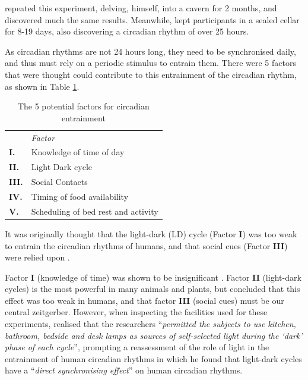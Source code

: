 \citet{siffreTime1964} repeated this experiment, delving, himself, into a cavern for 2 months, and discovered much the same results. Meanwhile, \citet{vonaschoffSpontanperiodikMenschenBei1962} kept participants in a sealed cellar for 8-19 days, also discovering a circadian rhythm of over 25 hours.

As circadian rhythms are not 24 hours long, they need to be synchronised daily, and thus must rely on a periodic stimulus to entrain them. There were 5 factors that were thought could contribute to this entrainment of the circadian rhythm, as shown in Table \ref{Tab:Factors}.

\begin{table}
\caption{The 5 potential factors for circadian entrainment \citep{czeislerEntrainmentHumanOrcadian1981}}
\label{Tab:Factors}
\begin{tabular}{l l}
\hline
 & \textit{Factor} \\
\textbf{I.}& Knowledge of time of day \\
\textbf{II.}& Light Dark cycle \\
\textbf{III.}& Social Contacts \\
\textbf{IV.}& Timing of food availability \\
\textbf{V.}& Scheduling of bed rest and activity \\
\hline
\end{tabular}
\end{table}


It was originally thought that the light-dark (LD) cycle (Factor \textbf{I}) was too weak to entrain the circadian rhythms of humans, and that social cues (Factor \textbf{III}) were relied upon \citep{aschoffHumanCircadianRhythms1971}. 

Factor \textbf{I} (knowledge of time) was shown to be insignificant \citep{millsCircadianRhythmsThree1964}. Factor \textbf{II} (light-dark cycles) is the most powerful in many animals and plants, but \citet{aschoffHumanCircadianRhythms1971} concluded that this effect was too weak in humans, and that factor \textbf{III} (social cues) must be our central zeitgerber. However, when inspecting the facilities used for these experiments, \citet{czeislerEntrainmentHumanOrcadian1981} realised that the researchers ``\textit{permitted the subjects to use kitchen, bathroom, bedside and desk lamps as sources of self-selected light during the `dark' phase of each cycle}'', prompting a reassessment of the role of light in the entrainment of human circadian rhythms in which he found that light-dark cycles have a ``\textit{direct synchronising effect}'' on human circadian rhythms.

